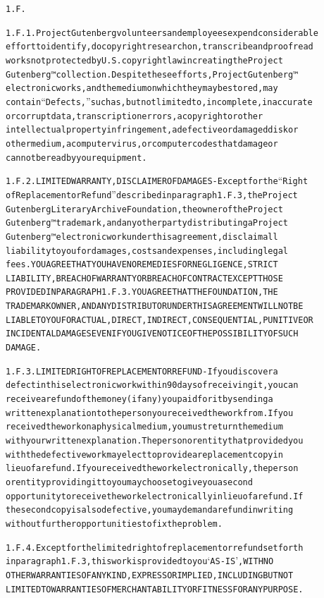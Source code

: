 \documentclass[12pt]{book}[2005/09/16]
\newenvironment{PGtext}{%
\begin{alltt}
\fontsize{9.2}{10.5}\ttfamily\selectfont}%
{\end{alltt}}
\begin{document}
\begin{PGtext}
1.F.

1.F.1. Project Gutenberg volunteers and employees expend considerable
effort to identify, do copyright research on, transcribe and proofread
works not protected by U.S. copyright law in creating the Project
Gutenberg™ collection. Despite these efforts, Project Gutenberg™
electronic works, and the medium on which they may be stored, may
contain “Defects,” such as, but not limited to, incomplete, inaccurate
or corrupt data, transcription errors, a copyright or other
intellectual property infringement, a defective or damaged disk or
other medium, a computer virus, or computer codes that damage or
cannot be read by your equipment.

1.F.2. LIMITED WARRANTY, DISCLAIMER OF DAMAGES - Except for the “Right
of Replacement or Refund” described in paragraph 1.F.3, the Project
Gutenberg Literary Archive Foundation, the owner of the Project
Gutenberg™ trademark, and any other party distributing a Project
Gutenberg™ electronic work under this agreement, disclaim all
liability to you for damages, costs and expenses, including legal
fees. YOU AGREE THAT YOU HAVE NO REMEDIES FOR NEGLIGENCE, STRICT
LIABILITY, BREACH OF WARRANTY OR BREACH OF CONTRACT EXCEPT THOSE
PROVIDED IN PARAGRAPH 1.F.3. YOU AGREE THAT THE FOUNDATION, THE
TRADEMARK OWNER, AND ANY DISTRIBUTOR UNDER THIS AGREEMENT WILL NOT BE
LIABLE TO YOU FOR ACTUAL, DIRECT, INDIRECT, CONSEQUENTIAL, PUNITIVE OR
INCIDENTAL DAMAGES EVEN IF YOU GIVE NOTICE OF THE POSSIBILITY OF SUCH
DAMAGE.

1.F.3. LIMITED RIGHT OF REPLACEMENT OR REFUND - If you discover a
defect in this electronic work within 90 days of receiving it, you can
receive a refund of the money (if any) you paid for it by sending a
written explanation to the person you received the work from. If you
received the work on a physical medium, you must return the medium
with your written explanation. The person or entity that provided you
with the defective work may elect to provide a replacement copy in
lieu of a refund. If you received the work electronically, the person
or entity providing it to you may choose to give you a second
opportunity to receive the work electronically in lieu of a refund. If
the second copy is also defective, you may demand a refund in writing
without further opportunities to fix the problem.

1.F.4. Except for the limited right of replacement or refund set forth
in paragraph 1.F.3, this work is provided to you ‘AS-IS’, WITH NO
OTHER WARRANTIES OF ANY KIND, EXPRESS OR IMPLIED, INCLUDING BUT NOT
LIMITED TO WARRANTIES OF MERCHANTABILITY OR FITNESS FOR ANY PURPOSE.


\end{PGtext}
\end{document}
